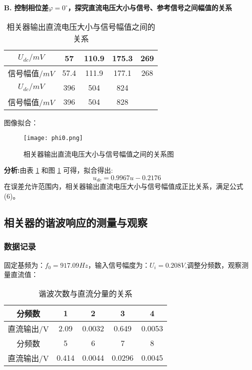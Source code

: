 \documentclass{whureport}
\begin{document}
\begin{multicols}{2}
\textbf{B. 控制相位差$\varphi = 0^\circ$，探究直流电压大小与信号、参考信号之间幅值的关系}

\begin{table}[H]
    \centering
    \caption{相关器输出直流电压大小与信号幅值之间的关系}
    \begin{tabular}{c|cccc}
        \toprule
        $U_{dc}/\si{mV}$ & 57 & 110.9 & 175.3 & 269  \\
        \midrule
        信号幅值$/\si{mV}$ & 57.4 & 111.9 & 177.1 & 268  \\
		\midrule
		$U_{dc}/\si{mV}$ & 396 & 504 & 824 & \\
        \midrule
        信号幅值$/\si{mV}$  & 396 & 504 & 828 & \\
        \bottomrule
    \end{tabular}
	\label{table:dc}
\end{table}

图像拟合：

\begin{figure}[H]
    \centering
    \texttt{[image: phi0.png]}
    \caption{相关器输出直流电压大小与信号幅值之间的关系图}
	\label{fig:input}
\end{figure}

\textbf{分析:}由表 \ref{table:dc} 和图 \ref{fig:input} 可得，拟合得出: \[u_{dc} = 0.9967u - 0.2176\]在误差允许范围内，相关器输出直流电压大小与信号幅值成正比关系，满足公式 (6)。
\newpage
\subsection{相关器的谐波响应的测量与观察}
\subsubsection{数据记录}
固定基频为：$f_0 = 917.09\unit{Hz}$，输入信号幅度为：$U_i = 0.208\unit{V}$,调整分频数，观察测量直流值：

\begin{table}[H]
	\centering
	\caption{谐波次数与直流分量的关系}
	\begin{tabular}{c|cccc}
		\toprule
		分频数 & 1 & 2 & 3 & 4  \\
		\midrule
		直流输出/\si{V} & 2.09 & 0.0032 & 0.649 & 0.0053  \\
		\midrule
		分频数  & 5 & 6 & 7 & 8\\
		\midrule
		直流输出/\si{V}  & 0.414 & 0.0044 & 0.0296 & 0.0045\\
		\bottomrule
	\end{tabular}
	\label{table:ndc}
\end{table}


\end{multicols}
\end{document}
